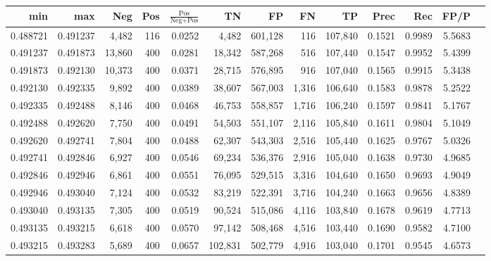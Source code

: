 \begin{tabular}{rrrrrrrrrrrrr}
\toprule
     min &      max &    Neg & Pos & $\frac{\text{Pos}}{\text{Neg}+\text{Pos}}$ &      TN &      FP &      FN &      TP &   Prec &    Rec &   FP/P \\
\midrule
0.488721 & 0.491237 &  4,482 & 116 &                                     0.0252 &   4,482 & 601,128 &     116 & 107,840 & 0.1521 & 0.9989 & 5.5683 \\
0.491237 & 0.491873 & 13,860 & 400 &                                     0.0281 &  18,342 & 587,268 &     516 & 107,440 & 0.1547 & 0.9952 & 5.4399 \\
0.491873 & 0.492130 & 10,373 & 400 &                                     0.0371 &  28,715 & 576,895 &     916 & 107,040 & 0.1565 & 0.9915 & 5.3438 \\
0.492130 & 0.492335 &  9,892 & 400 &                                     0.0389 &  38,607 & 567,003 &   1,316 & 106,640 & 0.1583 & 0.9878 & 5.2522 \\
0.492335 & 0.492488 &  8,146 & 400 &                                     0.0468 &  46,753 & 558,857 &   1,716 & 106,240 & 0.1597 & 0.9841 & 5.1767 \\
0.492488 & 0.492620 &  7,750 & 400 &                                     0.0491 &  54,503 & 551,107 &   2,116 & 105,840 & 0.1611 & 0.9804 & 5.1049 \\
0.492620 & 0.492741 &  7,804 & 400 &                                     0.0488 &  62,307 & 543,303 &   2,516 & 105,440 & 0.1625 & 0.9767 & 5.0326 \\
0.492741 & 0.492846 &  6,927 & 400 &                                     0.0546 &  69,234 & 536,376 &   2,916 & 105,040 & 0.1638 & 0.9730 & 4.9685 \\
0.492846 & 0.492946 &  6,861 & 400 &                                     0.0551 &  76,095 & 529,515 &   3,316 & 104,640 & 0.1650 & 0.9693 & 4.9049 \\
0.492946 & 0.493040 &  7,124 & 400 &                                     0.0532 &  83,219 & 522,391 &   3,716 & 104,240 & 0.1663 & 0.9656 & 4.8389 \\
0.493040 & 0.493135 &  7,305 & 400 &                                     0.0519 &  90,524 & 515,086 &   4,116 & 103,840 & 0.1678 & 0.9619 & 4.7713 \\
0.493135 & 0.493215 &  6,618 & 400 &                                     0.0570 &  97,142 & 508,468 &   4,516 & 103,440 & 0.1690 & 0.9582 & 4.7100 \\
0.493215 & 0.493283 &  5,689 & 400 &                                     0.0657 & 102,831 & 502,779 &   4,916 & 103,040 & 0.1701 & 0.9545 & 4.6573 \\

\end{tabular}
